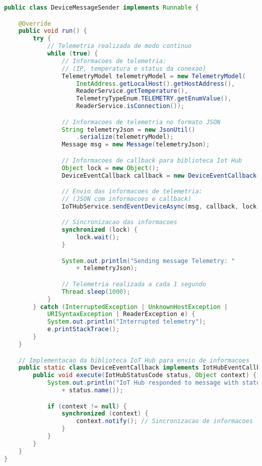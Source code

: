 \begin{lstlisting}[language={Java}, label=telemetria-placa]
public class DeviceMessageSender implements Runnable {

    @Override
    public void run() {
        try {
            // Telemetria realizada de modo continuo
            while (true) {
                // Informacoes de telemetria:
                // (IP, temperatura e status da conexao)
                TelemetryModel telemetryModel = new TelemetryModel(
                    InetAddress.getLocalHost().getHostAddress(),
                    ReaderService.getTemperature(),
                    TelemetryTypeEnum.TELEMETRY.getEnumValue(),
                    ReaderService.isConnection());

                // Informacoes de telemetria no formato JSON
                String telemetryJson = new JsonUtil()
                    .serialize(telemetryModel);
                Message msg = new Message(telemetryJson);

                // Informacoes de callback para biblioteca Iot Hub
                Object lock = new Object();
                DeviceEventCallback callback = new DeviceEventCallback();

                // Envio das informacoes de telemetria:
                // (JSON com informacoes e callback)
                IoTHubService.sendEventDeviceAsync(msg, callback, lock);

                // Sincronizacao das informacoes
                synchronized (lock) {
                    lock.wait();
                }

                System.out.println("Sending message Telemetry: "
                    + telemetryJson);

                // Telemetria realizada a cada 1 segundo
                Thread.sleep(1000);
            }
        } catch (InterruptedException | UnknownHostException |
            URISyntaxException | ReaderException e) {
            System.out.println("Interrupted telemetry");
            e.printStackTrace();
        }
    }

    // Implementacao da biblioteca IoT Hub para envio de informacoes
    public static class DeviceEventCallback implements IotHubEventCallback {
        public void execute(IotHubStatusCode status, Object context) {
            System.out.println("IoT Hub responded to message with status: "
                + status.name());

            if (context != null) {
                synchronized (context) {
                    context.notify(); // Sincronizacao de informacoes
                }
            }
        }
    }
}
\end{lstlisting}

